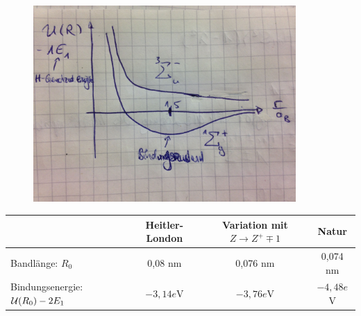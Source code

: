 	\begin{figure} [h]
		\begin{center}
			\includegraphics[width=10cm]{Homonukleare_Molekuele4}
		\end{center}
	\end{figure}
\FloatBarrier
	\begin{tabular}{l | c | c | c}
		 & Heitler-London & Variation mit $Z \rightarrow Z^+ \mp 1$ & Natur \\
		 \hline 
		Bandlänge: $R_0$ & 0,08 nm & 0,076 nm & 0,074 nm \\
		Bindungsenergie: $\mathcal{U} (R_0) - 2E_1$ & $-3,14 e$V & $-3,76 e$V & $-4,48 e$V \\ 
	\end{tabular}
